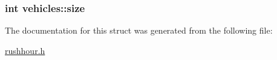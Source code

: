 \subsubsection[{\texorpdfstring{size}{size}}]{\setlength{\rightskip}{0pt plus 5cm}int vehicles\+::size}\hypertarget{structvehicles_a1c5f7e33e979bceaf13609a88e10cf62}{}\label{structvehicles_a1c5f7e33e979bceaf13609a88e10cf62}


The documentation for this struct was generated from the following file\+:\begin{DoxyCompactItemize}
\item 
\hyperlink{rushhour_8h}{rushhour.\+h}\end{DoxyCompactItemize}

